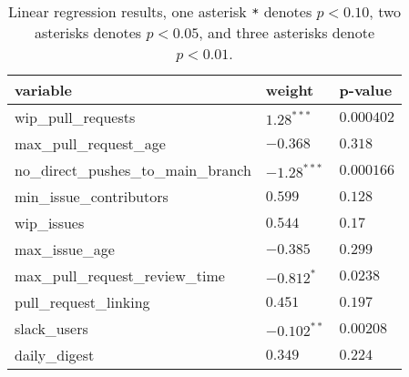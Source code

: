 \renewcommand{\arraystretch}{1.2}
\begin{table}[h]
\begin{center}
\begin{tabular}{|p{6cm}|p{4cm}|p{4cm}|} 
\hline
variable & weight & p-value \\ [0.5ex]
\hline\hline

wip\_pull\_requests & $1.28^{***}$ & $0.000402$ \\
max\_pull\_request\_age & $-0.368$ & $0.318$ \\
no\_direct\_pushes\_to\_main\_branch & $-1.28^{***}$ & $0.000166$ \\
min\_issue\_contributors & $0.599$ & $0.128$ \\
wip\_issues & $0.544$ & $0.17$ \\
max\_issue\_age & $-0.385$ & $0.299$ \\
max\_pull\_request\_review\_time & $-0.812^{*}$ & $0.0238$ \\
pull\_request\_linking & $0.451$ & $0.197$ \\
slack\_users & $-0.102^{**}$ & $0.00208$ \\
daily\_digest & $0.349$ & $0.224$ \\

\hline
\end{tabular}
\caption{Linear regression results, one asterisk \texttt{*} denotes  $p < 0.10$, two asterisks denotes $p < 0.05$, and three asterisks denote $p < 0.01$.}
\label{tab:lmResults}
\end{center}
\end{table}



